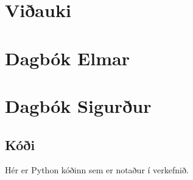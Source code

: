\section{Viðauki}
\begingroup
\obeylines
\section{Dagbók Elmar}

\endgroup
\begingroup
\obeylines
\section{Dagbók Sigurður}

\endgroup
\subsection{Kóði}
Hér er Python kóðinn sem er notaður í verkefnið.
\begingroup

\endgroup